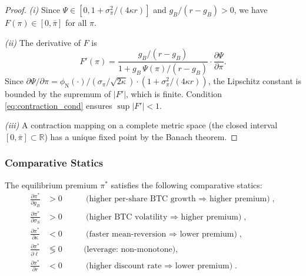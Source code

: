 \begin{proof}
\emph{(i)} Since $\Psi \in [0, 1 + \sigma_\pi^2/(4\kappa r)]$ and
$g_B/(r-g_B) > 0$, we have $F(\pi) \in [0, \bar\pi]$ for all $\pi$.

\emph{(ii)} The derivative of $F$ is
\[
  F'(\pi) = \frac{g_B/(r-g_B)}{1 + g_B\,\Psi(\pi)/(r-g_B)}
  \cdot \frac{\partial \Psi}{\partial \pi}.
\]
Since $\partial\Psi/\partial\pi = \phi_{\mathrm{N}}(\cdot) /
(\sigma_\pi/\sqrt{2\kappa}) \cdot (1 + \sigma_\pi^2/(4\kappa r))$, the
Lipschitz constant is bounded by the supremum of $|F'|$, which is finite.
Condition \eqref{eq:contraction_cond} ensures $\sup|F'| < 1$.

\emph{(iii)} A contraction mapping on a complete metric space (the closed
interval $[0,\bar\pi] \subset \mathbb{R}$) has a unique fixed point by
the Banach theorem.
\end{proof}

\subsubsection{Comparative Statics}

\begin{proposition}%
\label{prop:comp_statics}
The equilibrium premium $\pi^*$ satisfies the following comparative statics:
\begin{align}
  \frac{\partial \pi^*}{\partial g_B} &> 0
    &\quad& \text{(higher per-share BTC growth $\Rightarrow$ higher premium)},
    \label{eq:cs_gB} \\[4pt]
  \frac{\partial \pi^*}{\partial \sigma_S} &> 0
    &\quad& \text{(higher BTC volatility $\Rightarrow$ higher premium)},
    \label{eq:cs_sigma} \\[4pt]
  \frac{\partial \pi^*}{\partial \kappa} &< 0
    &\quad& \text{(faster mean-reversion $\Rightarrow$ lower premium)},
    \label{eq:cs_kappa} \\[4pt]
  \frac{\partial \pi^*}{\partial \bar\ell} &\lessgtr 0
    &\quad& \text{(leverage: non-monotone)},
    \label{eq:cs_ell} \\[4pt]
  \frac{\partial \pi^*}{\partial r} &< 0
    &\quad& \text{(higher discount rate $\Rightarrow$ lower premium)}.
    \label{eq:cs_r}
\end{align}
\end{proposition}

